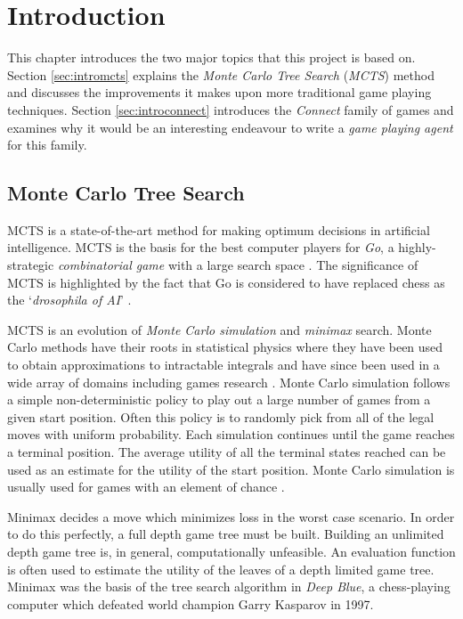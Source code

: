 \chapter{Introduction}
This chapter introduces the two major topics that this project is based on. Section \ref{sec:intromcts} explains the \textit{Monte Carlo Tree Search} (\textit{MCTS}) method and discusses the improvements it makes upon more traditional game playing techniques. Section \ref{sec:introconnect} introduces the \textit{Connect} family of games and examines why it would be an interesting endeavour to write a \textit{game playing agent} for this family.

\section{Monte Carlo Tree Search \label{sec:intromcts}}
MCTS is a state-of-the-art method for making optimum decisions in artificial intelligence. MCTS is the basis for the best computer players for \textit{Go}, a highly-strategic \textit{combinatorial game} with a large search space  \cite{firstmcts,go}. The significance of MCTS is highlighted by the fact that {Go} is considered to have replaced chess as the `\textit{drosophila of AI}' \cite{go}.

{MCTS} is an evolution of \textit{Monte Carlo simulation} and \textit{minimax} search. {Monte Carlo}  methods have their roots in statistical physics where they have been used to obtain approximations to intractable integrals and have since been used in a wide array of domains including games research \cite{survey}. {Monte Carlo simulation} follows a simple non-deterministic policy to play out a large number of games from a given start position. Often this policy is to randomly pick from all of the legal moves with uniform probability. Each simulation continues until the game reaches a terminal position. The average utility of all the terminal states reached can be used as an estimate for the utility of the start position. {Monte Carlo simulation} is usually used for games with an element of chance \cite{blackjack,backgammon}.  

{Minimax} decides a move which minimizes loss in the worst case scenario. In order to do this perfectly, a full  depth game tree must be built. Building an unlimited depth game tree is, in general, computationally unfeasible. An evaluation function is often used to estimate the utility of the leaves of a depth limited game tree. {Minimax} was the basis of the tree search algorithm in \textit{Deep Blue}, a chess-playing computer which defeated world champion Garry Kasparov in 1997.



